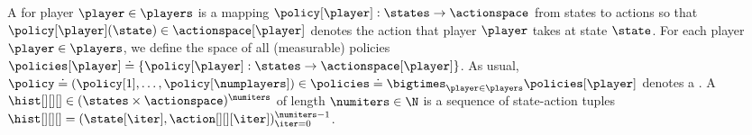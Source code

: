 A  \citep{maskin2001markov} for player $\player \in \players$ is a mapping $\policy[\player]: \states \to \actionspace$ from states to actions so that $\policy[\player](\state) \in \actionspace[\player]$ denotes the action that player $\player$ takes at state $\state$.
For each player $\player \in \players$, we define the space of all (measurable) policies $\policies[\player] \doteq \left\{\policy[\player]: \states \to \actionspace[\player]\right\}$. 
As usual, $\policy \doteq (\policy[1], \hdots, \policy[\numplayers]) \in \policies \doteq \smash{\bigtimes_{\player \in \players} \policies[\player]}$ denotes a .
A  $\hist[][][] \in (\states \times \actionspace)^\numiters$ of length $\numiters \in \N$ is a sequence of state-action tuples $\hist[][][] = (\state[\iter], \action[][][\iter])_{\iter = 0}^{\numiters - 1}$.  
